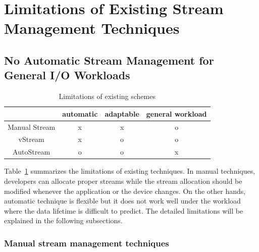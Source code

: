 \section{Limitations of Existing Stream Management Techniques}
\subsection{No Automatic Stream Management for General I/O Workloads}
\begin{table}[h]
	\caption{Limitations of existing schemes}
	\label{tab:limitation}
	\begin{center}
		\begin {tabular}{cccc}
		\hline
                   		& automatic & adaptable & general workload \\
		\hline \hline
		Manual Stream   &    x      &    x      &    o    \\
		\hline
		vStream         &    x      &    o      &    o    \\
		\hline
		AutoStream      &    o      &    o      &    x    \\
		\hline
	\end{tabular}
\end{center}
\end{table}

Table~\ref{tab:limitation} summarizes the limitations of existing techniques. 
In manual techniques, developers can allocate proper streams while the stream 
allocation should be modified whenever the application or the device changes.
On the other hands, automatic technique is flexible
but it does not work well under the workload where the data lifetime is 
difficult to predict.
The detailed limitations will be explained in the following subsections.


\subsubsection{Manual stream management techniques}

